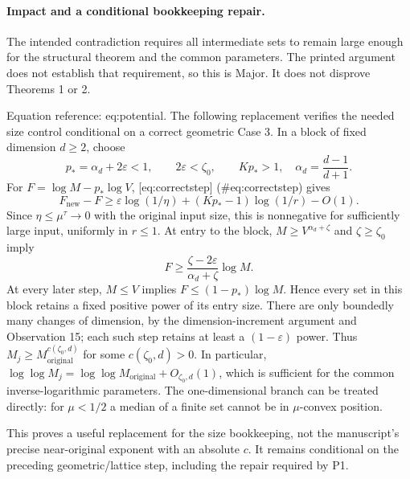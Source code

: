 \documentclass[10pt]{article}
\begin{document}
\paragraph*{Impact and a conditional bookkeeping repair.}\mbox{}\par
The intended contradiction requires all intermediate sets to remain large enough for the structural theorem and the common parameters. The printed argument does not establish that requirement, so this is Major. It does not disprove Theorems 1 or 2.\par
Equation reference: eq:potential. The following replacement verifies the needed size control conditional on a correct geometric Case 3. In a block of fixed dimension \(d\ge2\), choose \[p_*=\alpha_d+2\varepsilon<1,\qquad
 2\varepsilon<\zeta_0,\qquad Kp_*>1,
 \quad \alpha_d=\frac{d-1}{d+1}.\] For \(F=\log M-p_*\log V\), [eq:correctstep] (\#eq:correctstep) gives \[
 F_{\mathrm{new}}-F
 \ge\varepsilon\log(1/\eta)+(Kp_*-1)\log(1/r)-O(1).\] Since \(\eta\le\mu^\tau\to0\) with the original input size, this is nonnegative for sufficiently large input, uniformly in \(r\le1\). At entry to the block, \(M\ge V^{\alpha_d+\zeta}\) and \(\zeta\ge\zeta_0\) imply \[F\ge\frac{\zeta-2\varepsilon}{\alpha_d+\zeta}\log M.\] At every later step, \(M\le V\) implies \(F\le(1-p_*)\log M\). Hence every set in this block retains a fixed positive power of its entry size. There are only boundedly many changes of dimension, by the dimension-increment argument and Observation 15; each such step retains at least a \((1-\varepsilon)\) power. Thus \(M_j\ge M_{\mathrm{original}}^{c(\zeta_0,d)}\) for some \(c(\zeta_0,d)>0\). In particular, \(\log\log M_j=\log\log M_{\mathrm{original}}+O_{\zeta_0,d}(1)\), which is sufficient for the common inverse-logarithmic parameters. The one-dimensional branch can be treated directly: for \(\mu<1/2\) a median of a finite set cannot be in \(\mu\)-convex position.\par
This proves a useful replacement for the size bookkeeping, not the manuscript’s precise near-original exponent with an absolute \(c\). It remains conditional on the preceding geometric/lattice step, including the repair required by P1.\par
\end{document}
